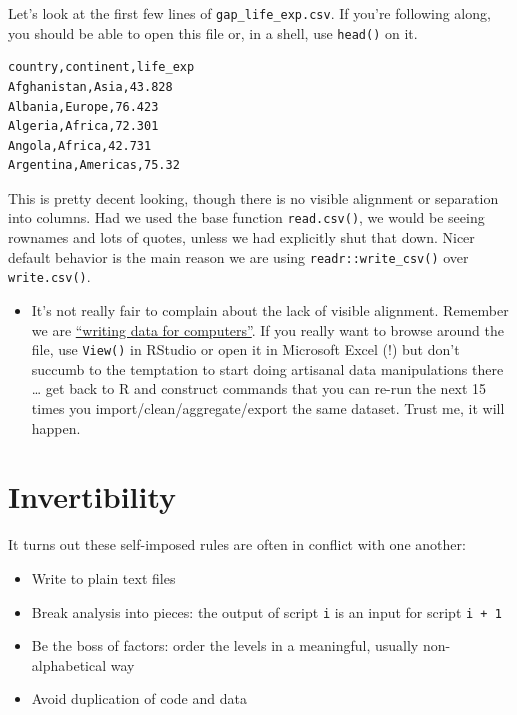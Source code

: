 \documentclass[
]{book}
\providecommand{\tightlist}{%
  \setlength{\itemsep}{0pt}\setlength{\parskip}{0pt}}
\begin{document}
Let's look at the first few lines of \texttt{gap\_life\_exp.csv}. If you're following along, you should be able to open this file or, in a shell, use \texttt{head()} on it.

\begin{verbatim}
country,continent,life_exp
Afghanistan,Asia,43.828
Albania,Europe,76.423
Algeria,Africa,72.301
Angola,Africa,42.731
Argentina,Americas,75.32
\end{verbatim}

This is pretty decent looking, though there is no visible alignment or separation into columns. Had we used the base function \texttt{read.csv()}, we would be seeing rownames and lots of quotes, unless we had explicitly shut that down. Nicer default behavior is the main reason we are using \texttt{readr::write\_csv()} over \texttt{write.csv()}.

\begin{itemize}
\tightlist
\item
  It's not really fair to complain about the lack of visible alignment. Remember we are \href{https://twitter.com/vsbuffalo/statuses/358699162679787521}{``writing data for computers''}. If you really want to browse around the file, use \texttt{View()} in RStudio or open it in Microsoft Excel (!) but don't succumb to the temptation to start doing artisanal data manipulations there \ldots{} get back to R and construct commands that you can re-run the next 15 times you import/clean/aggregate/export the same dataset. Trust me, it will happen.
\end{itemize}

\hypertarget{invertibility}{%
\section{Invertibility}\label{invertibility}}

It turns out these self-imposed rules are often in conflict with one another:

\begin{itemize}
\tightlist
\item
  Write to plain text files
\item
  Break analysis into pieces: the output of script \texttt{i} is an input for script \texttt{i\ +\ 1}
\item
  Be the boss of factors: order the levels in a meaningful, usually non-alphabetical way
\item
  Avoid duplication of code and data
\end{itemize}
\end{document}
